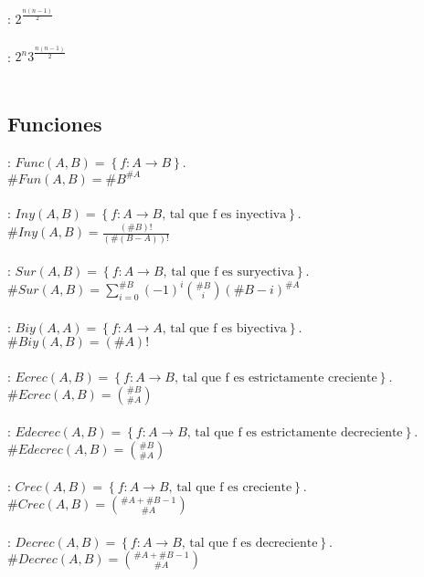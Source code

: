 \documentclass[a4paper,10pt]{article}
\begin{document}
: $2^{\frac {n(n-1)} {2}}$ \\ \\

: $2^{n}3^{\frac {n(n-1)} {2}}$ \\ \\


\subsection{Funciones}


: $Func(A,B) = \left\{f:A \longrightarrow B \right\}$.\\$\#Fun(A,B)={\#B}^{\#A} $ \\ \\
: $Iny(A,B) = \left\{f:A \longrightarrow B \mbox{, tal que f es inyectiva} \right\}$. \\$\#Iny(A,B) = \frac {({\#B})!} {(\# (B-A))!} $ \\ \\
: $Sur(A,B) = \left\{f:A \longrightarrow B \mbox{, tal que f es suryectiva} \right\}$. \\$\#Sur(A,B) = \displaystyle \sum_{i=0}^{\#B} {(-1)^i \binom {\#B}{i} (\#B-i)^{\#A}}$ \\ \\
: $Biy(A,A) = \left\{f: A \longrightarrow A \mbox{, tal que f es biyectiva} \right\}$. \\$\#Biy(A,B) = (\#A)!$ \\ \\
: $Ecrec(A,B) = \left\{f: A \longrightarrow B \mbox{, tal que f es estrictamente creciente} \right\}$. \\$ \# Ecrec(A,B) = \binom {\#B}{\#A}$ \\ \\
: $Edecrec(A,B) = \left\{f: A \longrightarrow B \mbox{, tal que f es estrictamente decreciente} \right\}$. \\$ \# Edecrec(A,B) = \binom {\#B}{\#A}$ \\ \\
: $Crec(A,B) = \left\{f: A \longrightarrow B \mbox{, tal que f es creciente} \right\}$. \\$ \# Crec(A,B) = \binom {\#A + \#B - 1}{\#A}$ \\ \\
: $Decrec(A,B) = \left\{f: A \longrightarrow B \mbox{, tal que f es decreciente} \right\}$. \\$ \# Decrec(A,B) = \binom {\#A + \#B - 1}{\#A}$ \\ \\
\end{document}

